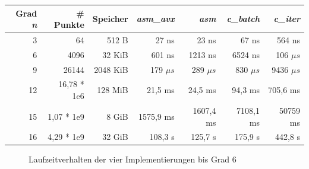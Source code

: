 \documentclass[course=erap]{aspdoc}
\begin{document}
\begin{center}
    \begin{tabular}{| r | r | r | r | r | r | r |}
    \hline
    Grad \textit{n} & \# Punkte & Speicher & \textit{asm\_avx} & \textit{asm} & \textit{c\_batch} & \textit{c\_iter}  \\ \hline
    3 & 64 & 512 B  & 27 ns & 23 ns & 67 ns & 564 ns \\  \hline
    6 & 4096 & 32 KiB  & 601 ns & 1213 ns & 6524 ns & 106 $\mu s$ \\  \hline
    9 & 26144 & 2048 KiB  & 179 $\mu s$ & 289 $\mu s$ & 830 $\mu s$ & 9436 $\mu s$  \\  \hline
    12 & 16,78 * 1e6 & 128 MiB & 21,5 ms & 24,5 ms & 94,3 ms & 705,6 ms \\ \hline
    15 & 1,07 * 1e9 & 8 GiB & 1575,9 ms & 1607,4 ms & 7108,1 ms & 50759 ms \\ \hline
    16 & 4,29 * 1e9 & 32 GiB & 108,3 s & 125,7 s & 175,9 s & 442,8 s \\ \hline
    \end{tabular}
\end{center}

\begin{figure}[htbp] 
    \centering
    \qquad
    \caption{Laufzeitverhalten der vier Implementierungen bis Grad 6}%
    \label{fig:Laufzeitvergleich}%
 \end{figure}
 
\end{document}
